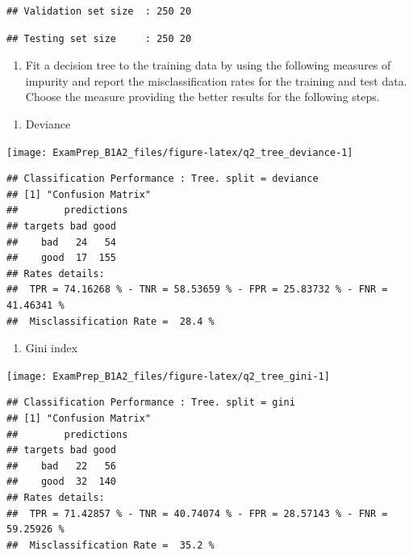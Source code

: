 \documentclass[
]{article}
\providecommand{\tightlist}{%
  \setlength{\itemsep}{0pt}\setlength{\parskip}{0pt}}
\begin{document}
\begin{verbatim}
## Validation set size  : 250 20
\end{verbatim}

\begin{verbatim}
## Testing set size     : 250 20
\end{verbatim}

\begin{enumerate}
\def\labelenumi{\arabic{enumi}.}
\setcounter{enumi}{1}
\tightlist
\item
  Fit a decision tree to the training data by using the following
  measures of impurity and report the misclassification rates for the
  training and test data. Choose the measure providing the better
  results for the following steps.
\end{enumerate}

\begin{enumerate}
\def\labelenumi{\alph{enumi}.}
\tightlist
\item
  Deviance
\end{enumerate}

\begin{center}\texttt{[image: ExamPrep\_B1A2\_files/figure-latex/q2\_tree\_deviance-1]} \end{center}

\begin{verbatim}
## Classification Performance : Tree. split = deviance 
## [1] "Confusion Matrix"
##        predictions
## targets bad good
##    bad   24   54
##    good  17  155
## Rates details:
##  TPR = 74.16268 % - TNR = 58.53659 % - FPR = 25.83732 % - FNR = 41.46341 %
##  Misclassification Rate =  28.4 %
\end{verbatim}

\begin{enumerate}
\def\labelenumi{\alph{enumi}.}
\setcounter{enumi}{1}
\tightlist
\item
  Gini index
\end{enumerate}

\begin{center}\texttt{[image: ExamPrep\_B1A2\_files/figure-latex/q2\_tree\_gini-1]} \end{center}

\begin{verbatim}
## Classification Performance : Tree. split = gini 
## [1] "Confusion Matrix"
##        predictions
## targets bad good
##    bad   22   56
##    good  32  140
## Rates details:
##  TPR = 71.42857 % - TNR = 40.74074 % - FPR = 28.57143 % - FNR = 59.25926 %
##  Misclassification Rate =  35.2 %
\end{verbatim}
\end{document}
